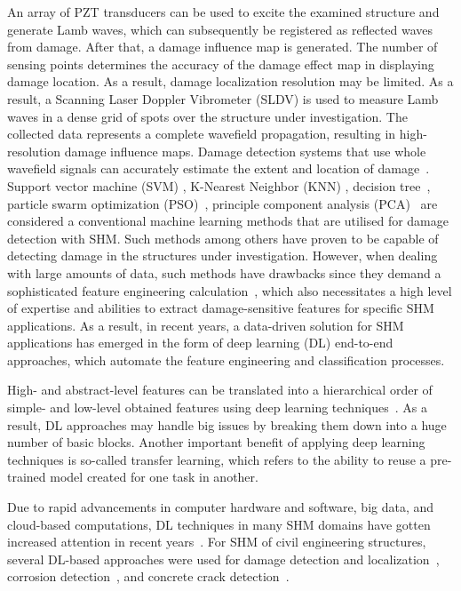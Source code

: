 An array of PZT transducers can be used to excite the examined structure and generate Lamb waves, which can subsequently be registered as reflected waves from damage.
After that, a damage influence map is generated.
The number of sensing points determines the accuracy of the damage effect map in displaying damage location.
As a result, damage localization resolution may be limited.
As a result, a Scanning Laser Doppler Vibrometer (SLDV) is used to measure Lamb waves in a dense grid of spots over the structure under investigation.
The collected data represents a complete wavefield propagation, resulting in high-resolution damage influence maps.
Damage detection systems that use whole wavefield signals can accurately estimate the extent and location of damage~\cite{Girolamo2018a, kudela2018impact}.
\\
Support vector machine (SVM) \cite{noori2010application, Khoa2014, Ghiasi2016}, K-Nearest Neighbor (KNN) \cite{Vitola2017}, decision tree~\cite{Mariniello2020}, particle swarm optimization (PSO)~\cite{Khatir2018, NouriShirazi2014}, principle component analysis (PCA)~\cite{wang2014principal, nguyen2010fault, liu2014research} are considered a conventional machine learning methods that are utilised for damage detection with SHM.
Such methods among others have proven to be capable of detecting damage in the structures under investigation.
However, when dealing with large amounts of data, such methods have drawbacks since they demand a sophisticated feature engineering calculation~\cite{Gulgec2019}, which also necessitates a high level of expertise and abilities to extract damage-sensitive features for specific SHM applications.
As a result, in recent years, a data-driven solution for SHM applications has emerged in the form of deep learning (DL) end-to-end approaches, which automate the feature engineering and classification processes.

High- and abstract-level features can be translated into a hierarchical order of simple- and low-level obtained features using deep learning techniques~\cite{goodfellow2016deep}.
As a result, DL approaches may handle big issues by breaking them down into a huge number of basic blocks.
Another important benefit of applying deep learning techniques is so-called transfer learning, which refers to the ability to reuse a pre-trained model created for one task in another.

Due to rapid advancements in computer hardware and software, big data, and cloud-based computations, DL techniques in many SHM domains have gotten increased attention in recent years~\cite{Azimi}.
For SHM of civil engineering structures, several DL-based approaches were used for damage detection and localization~\cite{Cha2018, Kong2018}, corrosion detection~\cite{Atha2018}, and concrete crack detection~\cite{Dung2019}.

